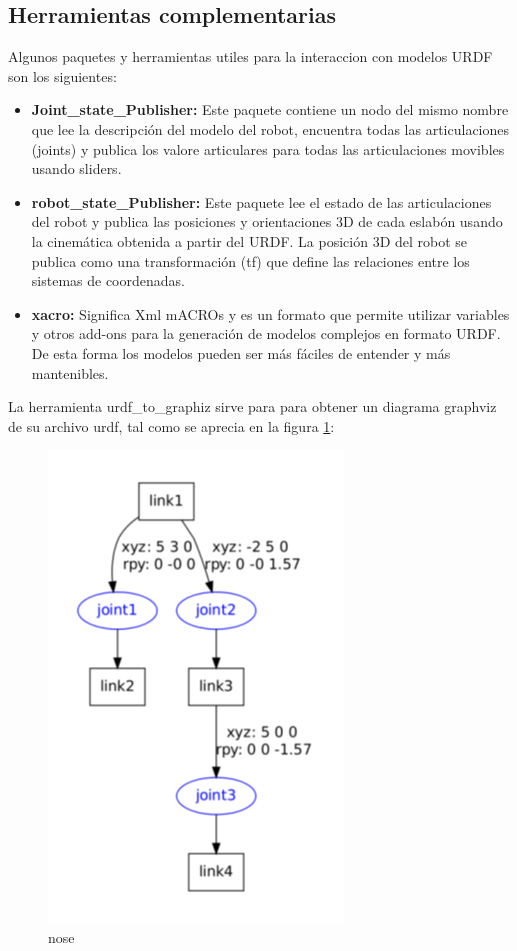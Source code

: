                                                 \newpage

    \subsection{Herramientas complementarias}
    
        Algunos paquetes y herramientas utiles para la interaccion con modelos URDF son los siguientes:
      
        \begin{itemize}
            \item \textbf{Joint\_state\_Publisher:} Este paquete contiene un nodo del mismo nombre que lee la descripción del modelo del robot, encuentra todas las articulaciones (joints) y publica los valore articulares para todas las articulaciones movibles usando sliders.
            \item \textbf{robot\_state\_Publisher:} Este paquete lee el estado de las articulaciones del robot y publica las posiciones y orientaciones 3D de cada eslabón usando la cinemática obtenida a partir del URDF. La posición 3D del robot se publica como una transformación (tf) que define las relaciones entre los sistemas de coordenadas.
            \item \textbf{xacro:} Significa Xml mACROs y es un formato que permite utilizar variables y otros add-ons para la generación de modelos complejos en formato URDF. De esta forma los modelos pueden ser más fáciles de entender y más mantenibles.
        \end{itemize}      
        
        La herramienta urdf\_to\_graphiz sirve para para obtener un diagrama graphviz de su archivo urdf, tal como se aprecia en la figura \ref{f:Cap3-9_nose_nose}:
        
        \begin{figure}[htb]
            \centering
            \includegraphics[width=0.45\linewidth]{Main/Chapter3/Images3/3-9/Esquema-de-los-componentes-de-un-fichero-urdf.png}
            \caption{nose}
            \label{f:Cap3-9_nose_nose}
        \end{figure} 
        
